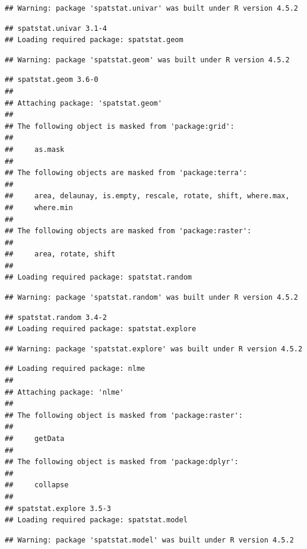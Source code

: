 \documentclass[
]{article}
\begin{document}
\begin{verbatim}
## Warning: package 'spatstat.univar' was built under R version 4.5.2
\end{verbatim}

\begin{verbatim}
## spatstat.univar 3.1-4
## Loading required package: spatstat.geom
\end{verbatim}

\begin{verbatim}
## Warning: package 'spatstat.geom' was built under R version 4.5.2
\end{verbatim}

\begin{verbatim}
## spatstat.geom 3.6-0
## 
## Attaching package: 'spatstat.geom'
## 
## The following object is masked from 'package:grid':
## 
##     as.mask
## 
## The following objects are masked from 'package:terra':
## 
##     area, delaunay, is.empty, rescale, rotate, shift, where.max,
##     where.min
## 
## The following objects are masked from 'package:raster':
## 
##     area, rotate, shift
## 
## Loading required package: spatstat.random
\end{verbatim}

\begin{verbatim}
## Warning: package 'spatstat.random' was built under R version 4.5.2
\end{verbatim}

\begin{verbatim}
## spatstat.random 3.4-2
## Loading required package: spatstat.explore
\end{verbatim}

\begin{verbatim}
## Warning: package 'spatstat.explore' was built under R version 4.5.2
\end{verbatim}

\begin{verbatim}
## Loading required package: nlme
## 
## Attaching package: 'nlme'
## 
## The following object is masked from 'package:raster':
## 
##     getData
## 
## The following object is masked from 'package:dplyr':
## 
##     collapse
## 
## spatstat.explore 3.5-3
## Loading required package: spatstat.model
\end{verbatim}

\begin{verbatim}
## Warning: package 'spatstat.model' was built under R version 4.5.2
\end{verbatim}
\end{document}
